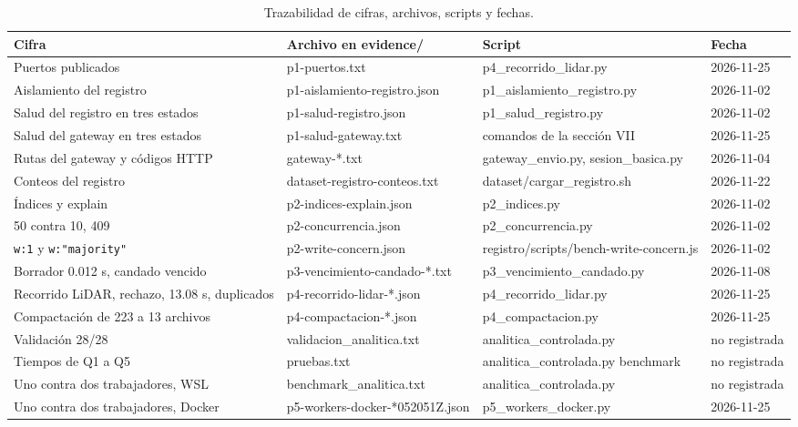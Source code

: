 \documentclass[conference]{IEEEtran}
\begin{document}
\begin{table}[!t]
\caption{Trazabilidad de cifras, archivos, scripts y fechas.}
\label{tab:traza}
\centering\footnotesize
\begin{tabularx}{\textwidth}{@{}X l l l@{}}
\toprule
\textbf{Cifra} & \textbf{Archivo en evidence/} & \textbf{Script} & \textbf{Fecha} \\
\midrule
Puertos publicados & p1-puertos.txt & p4\_recorrido\_lidar.py & 2026-11-25 \\
Aislamiento del registro & p1-aislamiento-registro.json & p1\_aislamiento\_registro.py & 2026-11-02 \\
Salud del registro en tres estados & p1-salud-registro.json & p1\_salud\_registro.py & 2026-11-02 \\
Salud del gateway en tres estados & p1-salud-gateway.txt & comandos de la sección VII & 2026-11-25 \\
Rutas del gateway y códigos HTTP & gateway-*.txt & gateway\_envio.py, sesion\_basica.py & 2026-11-04 \\
Conteos del registro & dataset-registro-conteos.txt & dataset/cargar\_registro.sh & 2026-11-22 \\
Índices y explain & p2-indices-explain.json & p2\_indices.py & 2026-11-02 \\
50 contra 10, 409 & p2-concurrencia.json & p2\_concurrencia.py & 2026-11-02 \\
\texttt{w:1} y \texttt{w:"majority"} & p2-write-concern.json & registro/scripts/bench-write-concern.js & 2026-11-02 \\
Borrador 0.012 s, candado vencido & p3-vencimiento-candado-*.txt & p3\_vencimiento\_candado.py & 2026-11-08 \\
Recorrido LiDAR, rechazo, 13.08 s, duplicados & p4-recorrido-lidar-*.json & p4\_recorrido\_lidar.py & 2026-11-25 \\
Compactación de 223 a 13 archivos & p4-compactacion-*.json & p4\_compactacion.py & 2026-11-25 \\
Validación 28/28 & validacion\_analitica.txt & analitica\_controlada.py & no registrada \\
Tiempos de Q1 a Q5 & pruebas.txt & analitica\_controlada.py benchmark & no registrada \\
Uno contra dos trabajadores, WSL & benchmark\_analitica.txt & analitica\_controlada.py & no registrada \\
Uno contra dos trabajadores, Docker & p5-workers-docker-*052051Z.json & p5\_workers\_docker.py & 2026-11-25 \\

\end{tabularx}
\end{table}
\end{document}
